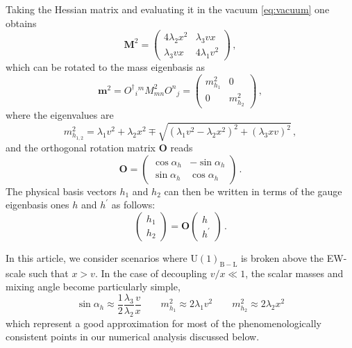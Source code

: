 \documentclass[a4paper,11pt]{article}
\renewcommand{\[}{\left[}
\renewcommand{\]}{\right]}
\newcommand{\U}[1]{\mathrm{U}(1)_{\mathrm{#1}}}			%
\begin{document}
Taking the Hessian matrix and evaluating it in the vacuum \eqref{eq:vacuum} one obtains
\begin{equation}
\bm{M}^2 =
\begin{pmatrix}
4 \lambda_2 x^2 & \lambda_3 v x \\ 
\lambda_3 v x   & 4 \lambda_1 v^2 
\end{pmatrix}\,,
\label{eq:hess}
\end{equation}
which can be rotated to the mass eigenbasis as
\begin{equation}
	\bm{m}^2 = {O^\dagger}_{i}{}^{m} M_{mn}^2 O^{n}{}_{j} = 
	\begin{pmatrix}
	m_{h_1}^2 & 0 \\ 
	0   & m_{h_2}^2 
	\end{pmatrix}\,,
\end{equation}
where the eigenvalues are
\begin{equation}
m_{h_{1,2}}^2 = \lambda_1 v^2 + \lambda_2 x^2 \mp \sqrt{(\lambda_1 v^2 - \lambda_2 x^2)^2 + (\lambda_3 x v)^2}\,,
\label{eq:eigvals}
\end{equation}
and the orthogonal rotation matrix $\bm{O}$ reads
\begin{equation}
	\bm{O} = 
	\begin{pmatrix}
	\cos \alpha_h & -\sin \alpha_h \\
	\sin \alpha_h & \cos \alpha_h 
	\end{pmatrix}\,.
	\label{eq:rotmat}
\end{equation}
The physical basis vectors $h_1$ and $h_2$ can then be written in terms of the gauge eigenbasis ones $h$ and $h^\prime$ as follows:
\begin{equation}
	\begin{pmatrix}
	h_1 \\
	h_2 
	\end{pmatrix}
	=
	\bm{O}
	\begin{pmatrix}
	h \\
	h^\prime 
	\end{pmatrix}\,.
	\label{eq:trans}
\end{equation}

In this article, we consider scenarios where $\U{B-L}$ is broken above the EW-scale such that $x > v$. 
In the case of decoupling $v/x\ll 1$, the scalar masses and mixing angle become particularly simple,
\begin{equation}
\sin \alpha_h \approx \dfrac{1}{2}\dfrac{\lambda_3}{\lambda_2} \dfrac{v}{x} \qquad
m_{h_1}^2 \approx 2 \lambda_1 v^2 \qquad m_{h_2}^2 \approx 2 \lambda_2 x^2
\label{eq:simplify}
\end{equation}
which represent a good approximation for most of the phenomenologically consistent points 
in our numerical analysis discussed below.
\end{document}
